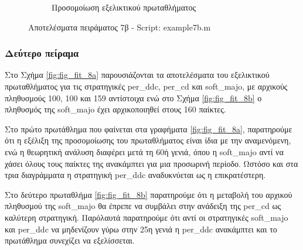 \documentclass[12pt]{report}
\begin{document}
\begin{figure}[htbp]
\begin{subfigure}[b]{0.5\linewidth}
        \caption{Προσομοίωση εξελικτικού πρωταθλήματος}
        \label{fig:fig_fit_7b_c}
        
    \end{subfigure}

    \caption{Αποτελέσματα πειράματος 7β - \foreignlanguage{english}{Script: example7b.m}}
    \label{fig:fig_fit_7b}
\end{figure}

\subsubsection*{Δεύτερο πείραμα}
Στο Σχήμα \ref{fig:fig_fit_8a} παρουσιάζονται τα αποτελέσματα του εξελικτικού πρωταθλήματος για τις στρατηγικές \foreignlanguage{english}{per\_ddc, per\_cd} και \foreignlanguage{english}{soft\_majo}, με αρχικούς πληθυσμούς 100, 100 και 159 αντίστοιχα ενώ στο Σχήμα \ref{fig:fig_fit_8b} ο πληθυσμός της \foreignlanguage{english}{soft\_majo} έχει αρχικοποιηθεί στους 160 παίκτες.

Στο πρώτο πρωτάθλημα που φαίνεται στα γραφήματα \ref{fig:fig_fit_8a}, παρατηρούμε ότι η εξέλιξη της προσομοίωσης του πρωταθλήματος είναι ίδια με την αναμενόμενη, ενώ η θεωρητική ανάλυση διαφέρει μετά τη 60ή γενιά, όπου η \foreignlanguage{english}{soft\_majo} αντί να χάσει όλους τους παίκτες της ανακάμπτει για μια προσωρινή περίοδο. Ωστόσο και στα τρια διαγράμματα η στρατηγική \foreignlanguage{english}{per\_ddc} αναδυκνύεται ως η επικρατέστερη.

Στο δεύτερο πρωταθλήμα \ref{fig:fig_fit_8b} παρατηρούμε ότι η μεταβολή του αρχικού πληθυσμού της \foreignlanguage{english}{soft\_majo} θα έπρεπε να συμβάλει στην ανάδειξη της \foreignlanguage{english}{per\_cd} ως καλύτερη στρατηγική. Παρόλαυτά παρατηρούμε ότι αντί οι στρατηγικές \foreignlanguage{english}{soft\_majo} και \foreignlanguage{english}{per\_ddc} να μηδενίζουν γύρω στην 25η γενιά η \foreignlanguage{english}{per\_ddc} ανακάμπτει και το πρωτάθλημα συνεχίζει να εξελίσσεται.
\end{document}
